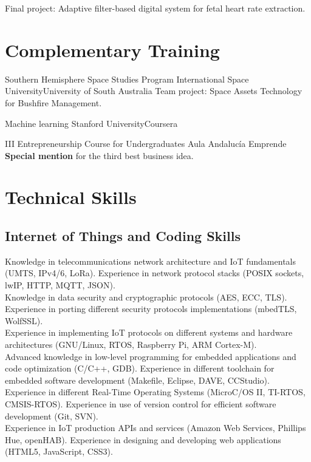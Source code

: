 \documentclass[11pt,a4paper,sans,spanish]{moderncv}
\begin{document}
{}{}{Final project: Adaptive filter-based digital system for fetal heart rate extraction.}



\section{Complementary Training}

{Southern Hemisphere Space Studies Program}
{International Space University}{University of South Australia}{}
{Team project: Space Assets Technology for Bushfire Management.}

{Machine learning}
{Stanford University}{Coursera}{}
{}

{III Entrepreneurship Course for Undergraduates}
{Aula Andalucía Emprende}{}{}
{\textbf{Special mention} for the third best business idea.}


\iffalse
\section{Technical Skills}

\subsection{Internet of Things and Coding Skills}
Knowledge in telecommunications network architecture and IoT fundamentals (UMTS, IPv4/6, LoRa). Experience in network protocol stacks (POSIX sockets, lwIP, HTTP, MQTT, JSON).
\protect\\[0.4em]
Knowledge in data security and cryptographic protocols (AES, ECC, TLS). Experience in porting different security protocols implementations (mbedTLS, WolfSSL).
\protect\\[0.4em]
Experience in implementing IoT protocols on different systems and hardware architectures (GNU/Linux, RTOS, Raspberry Pi, ARM Cortex-M).
\protect\\[0.4em]
Advanced knowledge in low-level programming for embedded applications and code optimization (C/C++, GDB). Experience in different toolchain for embedded software development (Makefile, Eclipse, DAVE, CCStudio). Experience in different Real-Time Operating Systems (MicroC/OS II, TI-RTOS, CMSIS-RTOS). Experience in use of version control for efficient software development (Git, SVN).
\protect\\[0.4em]
Experience in IoT production APIs and services (Amazon Web Services, Phillips Hue, openHAB). Experience in designing and developing web applications (HTML5, JavaScript, CSS3).
\end{document}
